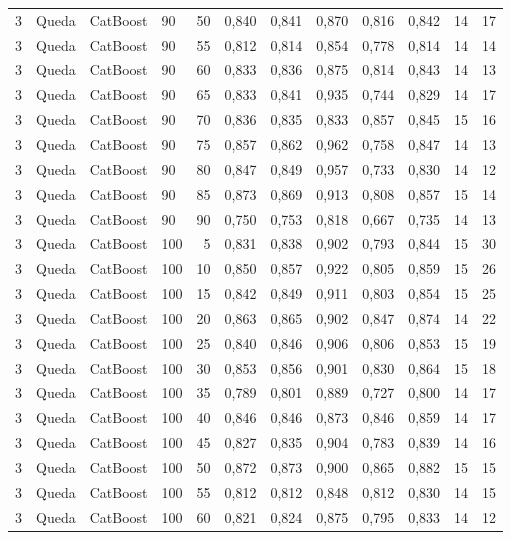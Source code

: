 \begin{longtable}{ccclrrrrrrrr}
3 & Queda & CatBoost & 90 & 50 & 0,840 & 0,841 & 0,870 & 0,816 & 0,842 & 14 & 17 \\
3 & Queda & CatBoost & 90 & 55 & 0,812 & 0,814 & 0,854 & 0,778 & 0,814 & 14 & 14 \\
3 & Queda & CatBoost & 90 & 60 & 0,833 & 0,836 & 0,875 & 0,814 & 0,843 & 14 & 13 \\
3 & Queda & CatBoost & 90 & 65 & 0,833 & 0,841 & 0,935 & 0,744 & 0,829 & 14 & 17 \\
3 & Queda & CatBoost & 90 & 70 & 0,836 & 0,835 & 0,833 & 0,857 & 0,845 & 15 & 16 \\
3 & Queda & CatBoost & 90 & 75 & 0,857 & 0,862 & 0,962 & 0,758 & 0,847 & 14 & 13 \\
3 & Queda & CatBoost & 90 & 80 & 0,847 & 0,849 & 0,957 & 0,733 & 0,830 & 14 & 12 \\
3 & Queda & CatBoost & 90 & 85 & 0,873 & 0,869 & 0,913 & 0,808 & 0,857 & 15 & 14 \\
3 & Queda & CatBoost & 90 & 90 & 0,750 & 0,753 & 0,818 & 0,667 & 0,735 & 14 & 13 \\
3 & Queda & CatBoost & 100 & 5 & 0,831 & 0,838 & 0,902 & 0,793 & 0,844 & 15 & 30 \\
3 & Queda & CatBoost & 100 & 10 & 0,850 & 0,857 & 0,922 & 0,805 & 0,859 & 15 & 26 \\
3 & Queda & CatBoost & 100 & 15 & 0,842 & 0,849 & 0,911 & 0,803 & 0,854 & 15 & 25 \\
3 & Queda & CatBoost & 100 & 20 & 0,863 & 0,865 & 0,902 & 0,847 & 0,874 & 14 & 22 \\
3 & Queda & CatBoost & 100 & 25 & 0,840 & 0,846 & 0,906 & 0,806 & 0,853 & 15 & 19 \\
3 & Queda & CatBoost & 100 & 30 & 0,853 & 0,856 & 0,901 & 0,830 & 0,864 & 15 & 18 \\
3 & Queda & CatBoost & 100 & 35 & 0,789 & 0,801 & 0,889 & 0,727 & 0,800 & 14 & 17 \\
3 & Queda & CatBoost & 100 & 40 & 0,846 & 0,846 & 0,873 & 0,846 & 0,859 & 14 & 17 \\
3 & Queda & CatBoost & 100 & 45 & 0,827 & 0,835 & 0,904 & 0,783 & 0,839 & 14 & 16 \\
3 & Queda & CatBoost & 100 & 50 & 0,872 & 0,873 & 0,900 & 0,865 & 0,882 & 15 & 15 \\
3 & Queda & CatBoost & 100 & 55 & 0,812 & 0,812 & 0,848 & 0,812 & 0,830 & 14 & 15 \\
3 & Queda & CatBoost & 100 & 60 & 0,821 & 0,824 & 0,875 & 0,795 & 0,833 & 14 & 12 \\

\end{longtable}
